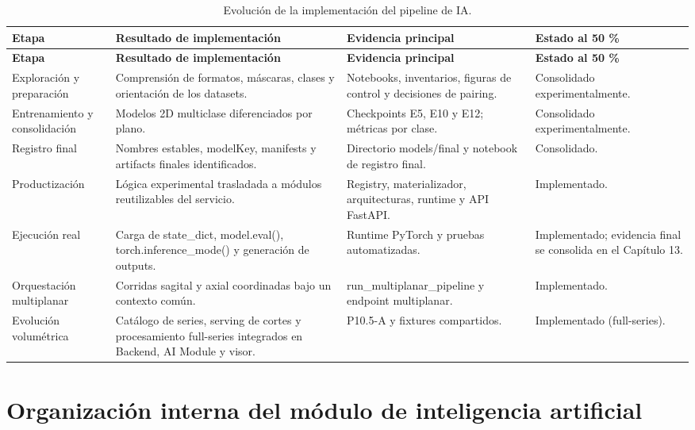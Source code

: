 \begin{longtable}{|>{\raggedright\arraybackslash}p{}|>{\raggedright\arraybackslash}p{}|>{\raggedright\arraybackslash}p{}|>{\raggedright\arraybackslash}p{}|}
\caption{Evolución de la implementación del pipeline de IA.}
\label{tab:anexo-f-pipeline-inferencia}\\
\hline
\textbf{Etapa} & \textbf{Resultado de implementación} & \textbf{Evidencia principal} & \textbf{Estado al 50 \%} \\
\hline
\endfirsthead
\hline
\textbf{Etapa} & \textbf{Resultado de implementación} & \textbf{Evidencia principal} & \textbf{Estado al 50 \%} \\
\hline
\endhead
Exploración y preparación & Comprensión de formatos, máscaras, clases y orientación de los datasets. & Notebooks, inventarios, figuras de control y decisiones de pairing. & Consolidado experimentalmente. \\
\hline
Entrenamiento y consolidación & Modelos 2D multiclase diferenciados por plano. & Checkpoints E5, E10 y E12; métricas por clase. & Consolidado experimentalmente. \\
\hline
Registro final & Nombres estables, modelKey, manifests y artifacts finales identificados. & Directorio models/final y notebook de registro final. & Consolidado. \\
\hline
Productización & Lógica experimental trasladada a módulos reutilizables del servicio. & Registry, materializador, arquitecturas, runtime y API FastAPI. & Implementado. \\
\hline
Ejecución real & Carga de state\_dict, model.eval(), torch.inference\_mode() y generación de outputs. & Runtime PyTorch y pruebas automatizadas. & Implementado; evidencia final se consolida en el Capítulo 13. \\
\hline
Orquestación multiplanar & Corridas sagital y axial coordinadas bajo un contexto común. & run\_multiplanar\_pipeline y endpoint multiplanar. & Implementado. \\
\hline
Evolución volumétrica & Catálogo de series, serving de cortes y procesamiento full-series integrados en Backend, AI Module y visor. & P10.5-A y fixtures compartidos. & Implementado (full-series). \\
\hline
\end{longtable}

\section{Organización interna del módulo de inteligencia artificial}
\label{anexo:f-organizacion-interna-ai}


